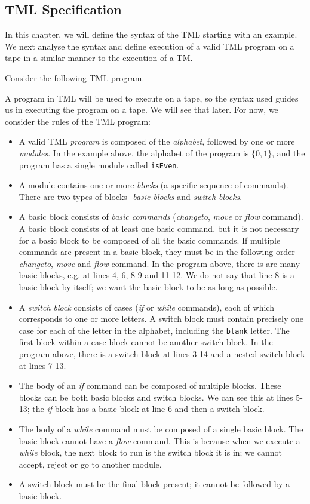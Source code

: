 \begin{appendices}
\chapter{TML Specification}

In this chapter, we will define the syntax of the TML starting with an example. We next analyse the syntax and define execution of a valid TML program on a tape in a similar manner to the execution of a TM.

Consider the following TML program.

A program in TML will be used to execute on a tape, so the syntax used guides us in executing the program on a tape. We will see that later. For now, we consider the rules of the TML program:
\begin{itemize}
    \item A valid TML \emph{program} is composed of the \emph{alphabet}, followed by one or more \emph{modules}. In the example above, the alphabet of the program is $\{0, 1\}$, and the program has a single module called \texttt{isEven}.
    \item A module contains one or more \emph{blocks} (a specific sequence of commands). There are two types of blocks- \emph{basic blocks} and \emph{switch blocks}.
    \item A basic block consists of \emph{basic commands} (\textit{changeto}, \textit{move} or \textit{flow} command). A basic block consists of at least one basic command, but it is not necessary for a basic block to be composed of all the basic commands. If multiple commands are present in a basic block, they must be in the following order- \textit{changeto}, \textit{move} and \textit{flow} command. In the program above, there is are many basic blocks, e.g. at lines 4, 6, 8-9 and 11-12. We do not say that line 8 is a basic block by itself; we want the basic block to be as long as possible.
    \item A \emph{switch block} consists of cases (\textit{if} or \textit{while} commands), each of which corresponds to one or more letters. A switch block must contain precisely one case for each of the letter in the alphabet, including the \texttt{blank} letter. The first block within a case block cannot be another switch block. In the program above, there is a switch block at lines 3-14 and a nested switch block at lines 7-13.
    \item The body of an \textit{if} command can be composed of multiple blocks. These blocks can be both basic blocks and switch blocks. We can see this at lines 5-13; the \textit{if} block has a basic block at line 6 and then a switch block.
    \item The body of a \textit{while} command must be composed of a single basic block. The basic block cannot have a \textit{flow} command. This is because when we execute a \textit{while} block, the next block to run is the switch block it is in; we cannot accept, reject or go to another module.
    \item A switch block must be the final block present; it cannot be followed by a basic block.
\end{itemize}


\end{appendices}
